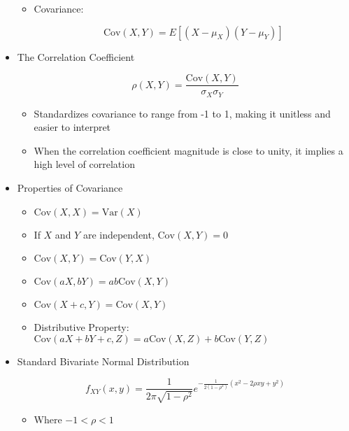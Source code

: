\begin{itemize}
\begin{itemize}
      \item Covariance:

        $$\text{Cov}(X,Y)=E[(X-\mu_X)(Y-\mu_Y)]$$

    \end{itemize}

  \item The Correlation Coefficient

    $$\rho(X,Y)=\frac{\text{Cov}(X,Y)}{\sigma_X\sigma_Y}$$

    \begin{itemize}

      \item Standardizes covariance to range from -1 to 1, making it unitless and easier to interpret

      \item When the correlation coefficient magnitude is close to unity, it implies a high level of correlation

    \end{itemize}

  \item Properties of Covariance

    \begin{itemize}

      \item $\text{Cov}(X,X)=\text{Var}(X)$

      \item If $X$ and $Y$ are independent, $\text{Cov}(X,Y)=0$

      \item $\text{Cov}(X,Y)=\text{Cov}(Y,X)$

      \item $\text{Cov}(aX,bY)=ab\text{Cov}(X,Y)$

      \item $\text{Cov}(X+c,Y)=\text{Cov}(X,Y)$

      \item Distributive Property: $\text{Cov}(aX+bY+c,Z)=a\text{Cov}(X,Z)+b\text{Cov}(Y,Z)$

    \end{itemize}

  \item Standard Bivariate Normal Distribution

    $$f_{XY}(x,y)=\frac{1}{2\pi\sqrt{1-\rho^2}}e^{-\frac{1}{2(1-\rho^2)}(x^2-2\rho xy +y^2)}$$

    \begin{itemize}

      \item Where $-1<\rho<1$

    \end{itemize}

\end{itemize}



